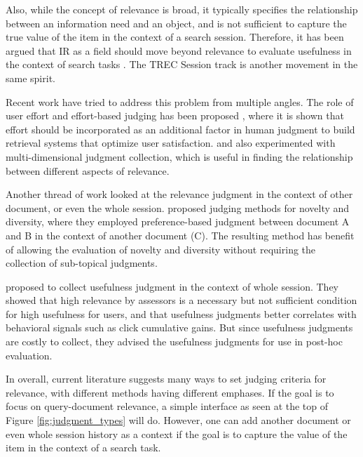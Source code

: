 Also, while the concept of relevance is broad, it typically specifies the relationship between an information need and an object, and is not sufficient to capture the true value of the item in the context of a search session. Therefore, it has been argued that IR as a field should move beyond relevance to evaluate usefulness in the context of search tasks \citep{Belkin:2015:SAL}. The TREC Session track \citep{carterette2014overview} is another movement in the same spirit.



Recent work have tried to address this problem from multiple angles. The role of user effort and effort-based judging has been proposed \cite{Yilmaz:2014} \cite{VermaYC16}, where it is shown that effort should be incorporated as an additional factor in human judgment to build retrieval systems that optimize user satisfaction. \cite{Golbus:2014:CDR} and \cite{Kim:2013} also experimented with multi-dimensional judgment collection, which is useful in finding the relationship between different aspects of relevance.

Another thread of work looked at the relevance judgment in the context of other document, or even the whole session. \cite{Chandar2013} proposed judging methods for novelty and diversity, where they employed preference-based judgment between document A and B in the context of another document (C). The resulting method has benefit of allowing the evaluation of novelty and diversity without requiring the collection of sub-topical judgments. 

\cite{Mao:2016} proposed to collect usefulness judgment in the context of whole session. They showed that high relevance by assessors is a necessary but not sufficient condition for high usefulness for users, and that usefulness judgments better correlates with behavioral signals such as click cumulative gains. But since usefulness judgments are costly to collect, they advised the usefulness judgments for use in post-hoc evaluation.

In overall, current literature suggests many ways to set judging criteria for relevance, with different methods having different emphases. If the goal is to focus on query-document relevance, a simple interface as seen at the top of Figure \ref{fig:judgment_types} will do. However, one can add another document or even whole session history as a context if the goal is  to capture the value of the item in the context of a search task. 

